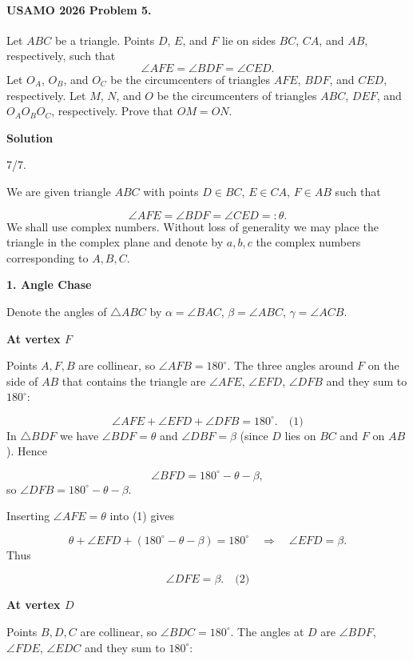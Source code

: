 \documentclass{llmxive}
\providecommand{\solutionheading}[1]{\par\smallskip\noindent\textbf{#1}\par}
\begin{document}
\paragraph{USAMO 2026 Problem 5.}
\begin{mdframed}[style=mdpurplebox,frametitle={USAMO 2026 Problem 5}]
Let $ABC$ be a triangle. Points $D$, $E$, and $F$ lie on sides $BC$, $CA$, and $AB$, respectively, such that
\[
\angle AFE = \angle BDF = \angle CED.
\]
Let $O_A$, $O_B$, and $O_C$ be the circumcenters of triangles $AFE$, $BDF$, and $CED$, respectively. Let $M$, $N$, and $O$ be the circumcenters of triangles $ABC$, $DEF$, and $O_A O_B O_C$, respectively. Prove that $OM = ON$.
\end{mdframed}
\solutionheading{Solution}
\begin{remark*}
  7/7.
\end{remark*}
We are given triangle \(ABC\) with points \(D\in BC\), \(E\in CA\), \(F\in AB\) such that\par
\[
\angle AFE = \angle BDF = \angle CED =: \theta.
\]
We shall use complex numbers. Without loss of generality we may place the triangle in the complex plane and denote by \(a,b,c\) the complex numbers corresponding to \(A,B,C\).\par
\smallskip
\solutionheading{1. Angle Chase}
Denote the angles of \(\triangle ABC\) by \(\alpha = \angle BAC\), \(\beta = \angle ABC\), \(\gamma = \angle ACB\).\par
\solutionheading{At vertex \(F\)}
Points \(A,F,B\) are collinear, so \(\angle AFB = 180^\circ\). The three angles around \(F\) on the side of \(AB\) that contains the triangle are \(\angle AFE\), \(\angle EFD\), \(\angle DFB\) and they sum to \(180^\circ\):\par
\[
\angle AFE + \angle EFD + \angle DFB = 180^\circ. \quad\text{(1)}
\]
In \(\triangle BDF\) we have \(\angle BDF = \theta\) and \(\angle DBF = \beta\) (since \(D\) lies on \(BC\) and \(F\) on \(AB\)). Hence\par
\[
\angle BFD = 180^\circ - \theta - \beta,
\]
so \(\angle DFB = 180^\circ - \theta - \beta\).\par
Inserting \(\angle AFE = \theta\) into (1) gives\par
\[
\theta + \angle EFD + (180^\circ - \theta - \beta) = 180^\circ \quad\Longrightarrow\quad \angle EFD = \beta.
\]
Thus\par
\[
\angle DFE = \beta. \quad\text{(2)}
\]
\solutionheading{At vertex \(D\)}
Points \(B,D,C\) are collinear, so \(\angle BDC = 180^\circ\). The angles at \(D\) are \(\angle BDF\), \(\angle FDE\), \(\angle EDC\) and they sum to \(180^\circ\):\par
\end{document}
